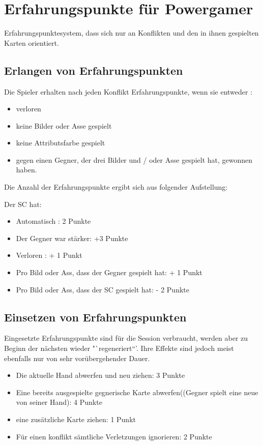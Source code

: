 \section{Erfahrungspunkte für Powergamer}
Erfahrungspunktesystem, dass sich nur an Konflikten und den in ihnen gespielten Karten orientiert.
\subsection{Erlangen von Erfahrungspunkten}

Die Spieler erhalten nach jeden Konflikt Erfahrungspunkte, wenn sie entweder :
\begin{itemize}
\item verloren
\item keine Bilder oder Asse gespielt
\item keine Attributsfarbe gespielt
\item gegen einen Gegner, der drei Bilder und / oder Asse gespielt hat, gewonnen haben.
\end{itemize}

Die Anzahl der Erfahrungspunkte ergibt sich aus folgender Aufstellung:

Der SC hat:
\begin{itemize}
\item Automatisch : 2 Punkte
\item Der Gegner war stärker: +3 Punkte
\item Verloren : + 1 Punkt
\item Pro Bild oder Ass, dass der Gegner gespielt hat: + 1 Punkt
\item Pro Bild oder Ass, dass der SC gespielt hat: - 2 Punkte
\end{itemize}

 

\subsection{Einsetzen von Erfahrungspunkten}

Eingesetzte Erfahrungspunkte sind für die Session verbraucht, werden aber zu Beginn der nächsten wieder "`regeneriert“'. Ihre Effekte sind jedoch meist ebenfalls nur von sehr vorübergehender Dauer.
\begin{itemize}
\item Die aktuelle Hand abwerfen und neu ziehen: 3 Punkte
\item Eine bereits ausgespielte gegnerische Karte abwerfen((Gegner spielt eine neue von seiner Hand): 4 Punkte
\item eine zusätzliche Karte ziehen: 1 Punkt
\item Für einen konflikt sämtliche Verletzungen ignorieren: 2 Punkte
\end{itemize}

